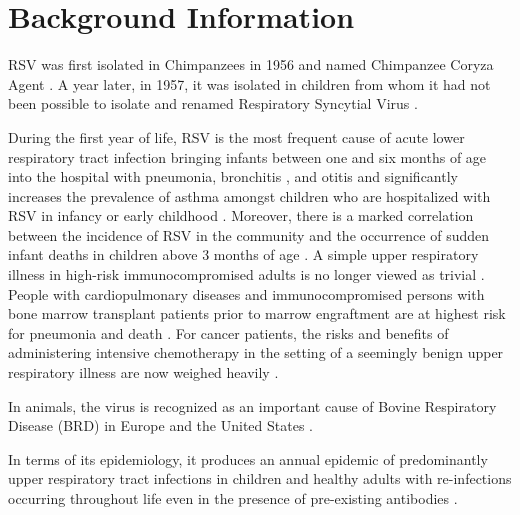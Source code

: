 \documentclass[11pt]{article}
\author{Njagi Mwaniki}
\date{\today}
\title{}
\begin{document}
\tableofcontents

\section{Background Information}
\label{sec:orgbfaff01}

RSV was first isolated in Chimpanzees in 1956 and named Chimpanzee Coryza Agent
\cite{morrisRecoveryCytopathogenicAgent1956}. 
A year later, in 1957, it was isolated in children from
whom it had not been possible to isolate and renamed Respiratory Syncytial
Virus \cite{beemAssociationChimpanzeeCoryza1960,chanockRecoveryInfantsRespiratory1957,zlatevaGeneticVariabilityMolecular2005}.

During the first year of life, RSV is the most frequent cause of acute lower
respiratory tract infection bringing infants between one and six months of age
into the hospital with pneumonia, bronchitis
\cite{stottRespiratorySyncytialVirus1985,zlatevaMolecularEvolutionCirculation2004,borchersRespiratorySyncytialVirus2013}, 
and otitis \cite{kleinRoleRespiratorySyncytial1982} and significantly increases the prevalence of
asthma amongst children who are hospitalized with RSV in infancy or early
childhood \cite{borchersRespiratorySyncytialVirus2013}. Moreover, there is a marked correlation
between the incidence of RSV in the community and the occurrence of sudden
infant deaths in children above 3 months of age \cite{chanockRecoveryInfantsRespiratory1957}.
A simple upper respiratory illness in high-risk immunocompromised adults is no
longer viewed as trivial \cite{whimbeyRespiratorySyncytialVirus2000}. 
People with cardiopulmonary diseases and immunocompromised persons with bone
marrow transplant patients prior to marrow engraftment are at highest risk for
pneumonia and death \cite{morrisRecoveryCytopathogenicAgent1956}.
For cancer patients, the risks and benefits of
administering intensive chemotherapy in the setting of a seemingly benign upper
respiratory illness are now weighed heavily \cite{kleinRoleRespiratorySyncytial1982}.

In animals, the virus is recognized as an important cause of Bovine Respiratory
Disease (BRD) in Europe and the United States \cite{whimbeyRespiratorySyncytialVirus2000}.

In terms of its epidemiology, it produces an annual epidemic of predominantly 
upper respiratory tract infections in children and healthy adults
\cite{chanockRecoveryInfantsRespiratory1957} with re-infections occurring throughout
life even in the presence of pre-existing antibodies \cite{sullenderGeneticDiversityAttachment1991}.
\end{document}
